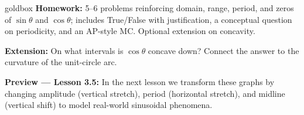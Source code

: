 \documentclass[10pt]{article}
\begin{document}
\begin{skillbox}{goldbox}
    \textbf{Homework:} 5--6 problems reinforcing domain, range, period, and zeros of
    $\sin\theta$ and $\cos\theta$; includes True/False with justification, a conceptual
    question on periodicity, and an AP-style MC. Optional extension on concavity.

    \vspace{4pt}
    \textbf{Extension:} On what intervals is $\cos\theta$ concave down? Connect the answer
    to the curvature of the unit-circle arc.

    \vspace{4pt}
    \textbf{Preview --- Lesson 3.5:} In the next lesson we transform these graphs by changing
    amplitude (vertical stretch), period (horizontal stretch), and midline (vertical shift) to
    model real-world sinusoidal phenomena.
\end{skillbox}
\end{document}
